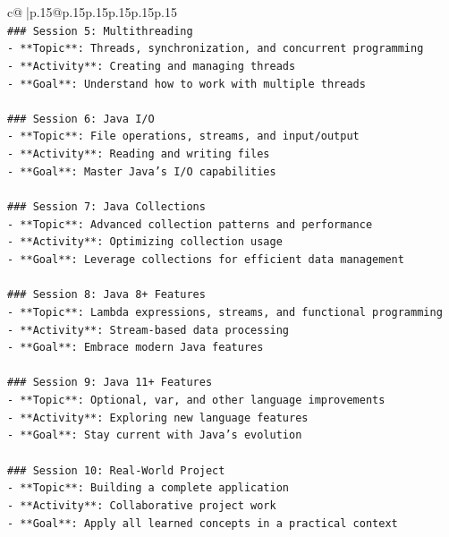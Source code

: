 \documentclass{article}
\begin{document}
{\begin{supertabular}{c@{$\;$}|p{.15\linewidth}@{}p{.15\linewidth}p{.15\linewidth}p{.15\linewidth}p{.15\linewidth}p{.15\linewidth}}
{{{\\ 
\texttt{\#\#\# Session 5: Multithreading} \\
\texttt{{-} **Topic**: Threads, synchronization, and concurrent programming} \\
\texttt{{-} **Activity**: Creating and managing threads} \\
\texttt{{-} **Goal**: Understand how to work with multiple threads} \\
\\ 
\texttt{\#\#\# Session 6: Java I/O} \\
\texttt{{-} **Topic**: File operations, streams, and input/output} \\
\texttt{{-} **Activity**: Reading and writing files} \\
\texttt{{-} **Goal**: Master Java's I/O capabilities} \\
\\ 
\texttt{\#\#\# Session 7: Java Collections} \\
\texttt{{-} **Topic**: Advanced collection patterns and performance} \\
\texttt{{-} **Activity**: Optimizing collection usage} \\
\texttt{{-} **Goal**: Leverage collections for efficient data management} \\
\\ 
\texttt{\#\#\# Session 8: Java 8+ Features} \\
\texttt{{-} **Topic**: Lambda expressions, streams, and functional programming} \\
\texttt{{-} **Activity**: Stream{-}based data processing} \\
\texttt{{-} **Goal**: Embrace modern Java features} \\
\\ 
\texttt{\#\#\# Session 9: Java 11+ Features} \\
\texttt{{-} **Topic**: Optional, var, and other language improvements} \\
\texttt{{-} **Activity**: Exploring new language features} \\
\texttt{{-} **Goal**: Stay current with Java's evolution} \\
\\ 
\texttt{\#\#\# Session 10: Real{-}World Project} \\
\texttt{{-} **Topic**: Building a complete application} \\
\texttt{{-} **Activity**: Collaborative project work} \\
\texttt{{-} **Goal**: Apply all learned concepts in a practical context} \\
}}}
\end{supertabular}}
\end{document}
